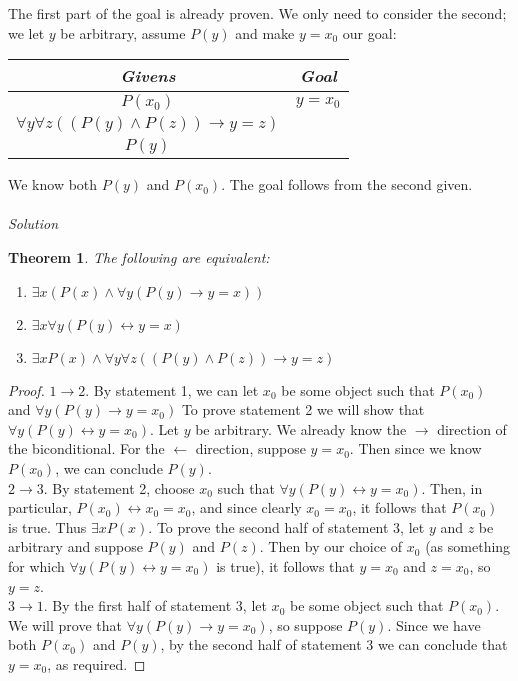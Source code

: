 \documentclass{report}
\newtheorem*{theorem}{Theorem}
\theoremstyle{definition}
\begin{document}
The first part of the goal is already proven. We only need to consider the second; we let $y$ be arbitrary, assume $P(y)$ and make $y=x_0$ our goal:
\begin{center}
\begin{tabular}{c|c}
\textit{Givens}&\textit{Goal}\\
\hline
$P(x_0)$&$y=x_0$\\
$\forall y\forall z((P(y)\land P(z))\to y=z)$&\\
$P(y)$&
\end{tabular}
\end{center}
We know both $P(y)$ and $P(x_0)$. The goal follows from the second given.\\
\vspace{1mm}\\
\textit{Solution}
\begin{theorem}
The following are equivalent:
\begin{enumerate}
\item$\exists x(P(x)\land\forall y(P(y)\to y=x))$
\item$\exists x\forall y(P(y)\leftrightarrow y=x)$
\item$\exists xP(x)\land\forall y\forall z((P(y)\land P(z))\to y=z)$ 
\end{enumerate}
\end{theorem}
\begin{proof}
$1\to2$. By statement 1, we can let $x_0$ be some object such that $P(x_0)$ and $\forall y(P(y)\to y=x_0)$ To prove statement 2 we will show that $\forall y(P(y)\leftrightarrow y=x_0)$. Let $y$ be 
arbitrary. We already know the $\rightarrow$ direction of the biconditional. For the $\leftarrow$ direction, suppose $y=x_0$. Then since we know $P(x_0)$, we can conclude $P(y)$.\\
\indent$2\to3$. By statement 2, choose $x_0$ such that $\forall y(P(y)\leftrightarrow y=x_0)$. Then, in particular, $P(x_0)\leftrightarrow x_0=x_0$, and since clearly $x_0=x_0$, it follows that
$P(x_0)$ is true. Thus $\exists xP(x)$. To prove the second half of statement 3, let $y$ and $z$ be arbitrary and suppose $P(y)$ and $P(z)$. Then by our choice of $x_0$ (as something for which 
$\forall y(P(y)\leftrightarrow y=x_0)$ is true), it follows that $y=x_0$ and $z=x_0$, so $y=z$.\\
\indent$3\to1$. By the first half of statement 3, let $x_0$ be some object such that $P(x_0)$. We will prove that $\forall y(P(y)\to y=x_0)$, so suppose $P(y)$. Since we have both
$P(x_0)$ and $P(y)$, by the second half of statement 3 we can conclude that $y=x_0$, as required.
\end{proof}
\newpage
\end{document}
